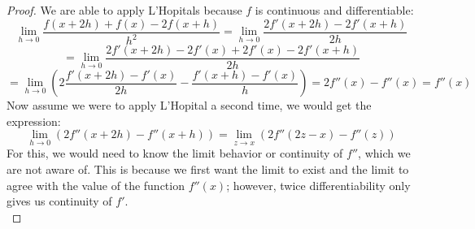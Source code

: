 \documentclass[10pt,letterpaper]{article} %
\begin{document}
\begin{proof}
We are able to apply L'Hopitals because $f$ is continuous and differentiable:
\begin{equation*}
\lim_{h \xrightarrow{} 0}\frac{f(x+2h) + f(x) - 2f(x+h)}{h^2} = \lim_{h \xrightarrow{} 0}\frac{2f'(x+2h) - 2f'(x+h)}{2h}
\end{equation*}
\begin{equation*}
= \lim_{h \xrightarrow{} 0}\frac{2f'(x+2h) - 2f'(x) + 2f'(x) - 2f'(x+h)}{2h}
\end{equation*}
\begin{equation*}
= \lim_{h \xrightarrow{} 0}\left(2\frac{f'(x+2h)-f'(x)}{2h} - \frac{f'(x+h) - f'(x)}{h}\right) = 2f''(x) - f''(x) = f''(x)
\end{equation*}
Now assume we were to apply L'Hopital a second time, we would get the expression:
\begin{equation*}
\lim_{h \xrightarrow{} 0}(2f''(x+2h)- f''(x+h)) = \lim_{z \xrightarrow{}x}(2f''(2z-x) - f''(z))
\end{equation*}
For this, we would need to know the limit behavior or continuity of $f''$, which we are not aware of. This is because we first want the limit to exist and the limit to agree with the value of the function $f''(x)$; however, twice differentiability only gives us continuity of $f'$.\\


\end{proof}
\end{document}

